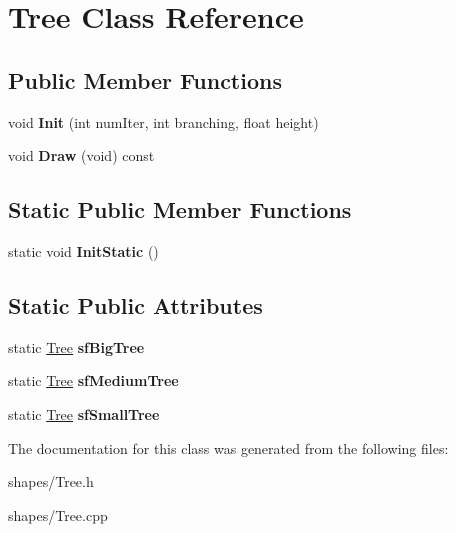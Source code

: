\hypertarget{classTree}{\section{\-Tree \-Class \-Reference}
\label{classTree}
}
\subsection*{\-Public \-Member \-Functions}
\begin{DoxyCompactItemize}
\item 
\hypertarget{classTree_ad25b4855df1c9398269ba0a3fac9dccd}{void {\bfseries \-Init} (int num\-Iter, int branching, float height)}\label{classTree_ad25b4855df1c9398269ba0a3fac9dccd}

\item 
\hypertarget{classTree_add6dbeaf337c9bf0756cc91a9887d0e0}{void {\bfseries \-Draw} (void) const }\label{classTree_add6dbeaf337c9bf0756cc91a9887d0e0}

\end{DoxyCompactItemize}
\subsection*{\-Static \-Public \-Member \-Functions}
\begin{DoxyCompactItemize}
\item 
\hypertarget{classTree_ad97df9ca684657912b5da40a0b973501}{static void {\bfseries \-Init\-Static} ()}\label{classTree_ad97df9ca684657912b5da40a0b973501}

\end{DoxyCompactItemize}
\subsection*{\-Static \-Public \-Attributes}
\begin{DoxyCompactItemize}
\item 
\hypertarget{classTree_a111d4234ca7e1ac7320e599502940eec}{static \hyperlink{classTree}{\-Tree} {\bfseries sf\-Big\-Tree}}\label{classTree_a111d4234ca7e1ac7320e599502940eec}

\item 
\hypertarget{classTree_aa643295314dc011f7890dca07a1a5888}{static \hyperlink{classTree}{\-Tree} {\bfseries sf\-Medium\-Tree}}\label{classTree_aa643295314dc011f7890dca07a1a5888}

\item 
\hypertarget{classTree_a9d8547e8c76e20fce3914529de4d42ed}{static \hyperlink{classTree}{\-Tree} {\bfseries sf\-Small\-Tree}}\label{classTree_a9d8547e8c76e20fce3914529de4d42ed}

\end{DoxyCompactItemize}


\-The documentation for this class was generated from the following files\-:\begin{DoxyCompactItemize}
\item 
shapes/\-Tree.\-h\item 
shapes/\-Tree.\-cpp\end{DoxyCompactItemize}
